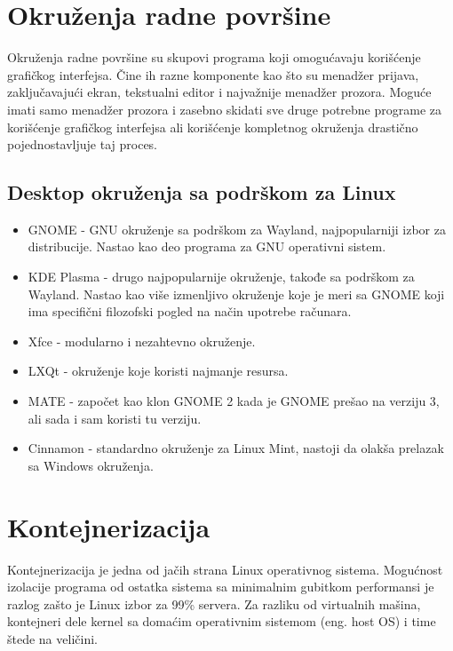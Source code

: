 \documentclass[a4paper,14pt]{article}
\begin{document}
\section{Okruženja radne površine}
Okruženja radne površine su skupovi programa koji omogućavaju korišćenje grafičkog interfejsa. Čine ih razne komponente kao što su menadžer prijava, zaključavajući ekran, tekstualni editor i najvažnije menadžer prozora. Moguće imati samo menadžer prozora i zasebno skidati sve druge potrebne programe za korišćenje grafičkog interfejsa ali korišćenje kompletnog okruženja drastično pojednostavljuje taj proces.
\subsection{Desktop okruženja sa podrškom za Linux}
\begin{itemize}
\item GNOME\cite{gnome} - GNU okruženje sa podrškom za Wayland, najpopularniji izbor za distribucije. Nastao kao deo programa za GNU operativni sistem.
\item KDE Plasma\cite{kdeplasma}  - drugo najpopularnije okruženje, takođe sa podrškom za Wayland. Nastao kao više izmenljivo okruženje koje je meri sa GNOME koji ima specifični filozofski pogled na način upotrebe računara.
\item Xfce\cite{xfce} - modularno i nezahtevno okruženje.
\item LXQt\cite{lxqt} - okruženje koje koristi najmanje resursa.
\item MATE\cite{mate} - započet kao klon GNOME 2 kada je GNOME prešao na verziju 3, ali sada i sam koristi tu verziju.
\item Cinnamon\cite{cinnamon} - standardno okruženje za Linux Mint, nastoji da olakša prelazak sa Windows okruženja.
\end{itemize}
\newpage

\section{Kontejnerizacija}
Kontejnerizacija je jedna od jačih strana Linux operativnog sistema. Mogućnost izolacije programa od ostatka sistema sa minimalnim gubitkom performansi je razlog zašto je Linux izbor za 99\% servera. Za razliku od virtualnih mašina, kontejneri dele kernel sa domaćim operativnim sistemom (eng. host OS) i time štede na veličini.
\end{document}
